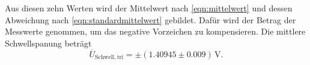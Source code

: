 Aus diesen zehn Werten wird der Mittelwert nach \autoref{eqn:mittelwert} und dessen Abweichung nach \autoref{eqn:standardmittelwert} gebildet. Dafür wird der Betrag der Messwerte genommen, um das negative Vorzeichen zu kompensieren. Die mittlere Schwellspanung beträgt 
\begin{equation}
  \overline{U}_{\mathrm{Schwell,tri}} = \pm(1.40945\pm0.009)\,\unit{\volt}.
\end{equation}



